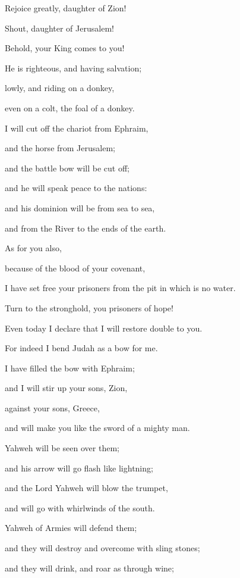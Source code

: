 {\par }{\Q {}Rejoice greatly, daughter of Zion!
\par }{\QB Shout, daughter of Jerusalem!
\par }{\Q Behold, your King comes to you!
\par }{\QB He is righteous, and having salvation;
\par }{\QB lowly, and riding on a donkey,
\par }{\QB even on a colt, the foal of a donkey.
\par }{\Q {}I will cut off the chariot from Ephraim,
\par }{\QB and the horse from Jerusalem;
\par }{\Q and the battle bow will be cut off;
\par }{\QB and he will speak peace to the nations:
\par }{\QB and his dominion will be from sea to sea,
\par }{\QB and from the River to the ends of the earth.
\par }{\Q {}As for you also,
\par }{\QB because of the blood of your covenant,
\par }{\QB I have set free your prisoners from the pit in which is no water.
\par }{\Q {}Turn to the stronghold, you prisoners of hope!
\par }{\QB Even today I declare that I will restore double to you.
\par }{\Q {}For indeed I bend Judah as a bow for me.
\par }{\QB I have filled the bow with Ephraim;
\par }{\Q and I will stir up your sons, Zion,
\par }{\QB against your sons, Greece,
\par }{\QB and will make you like the sword of a mighty man.
\par }{\Q {}Yahweh will be seen over them;
\par }{\QB and his arrow will go flash like lightning;
\par }{\QB and the Lord Yahweh will blow the trumpet,
\par }{\QB and will go with whirlwinds of the south.
\par }{\Q {}Yahweh of Armies will defend them;
\par }{\QB and they will destroy and overcome with sling stones;
\par }{\QB and they will drink, and roar as through wine;
}

